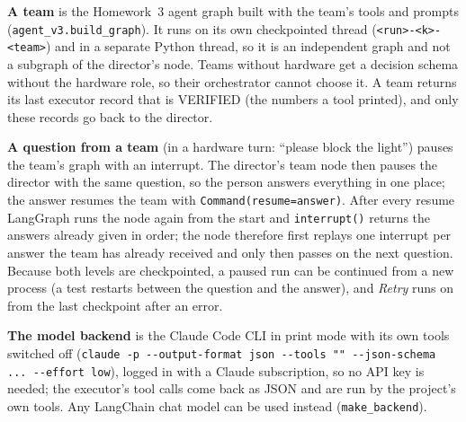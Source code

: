 \documentclass[11pt,a4paper]{article}
\begin{document}
\textbf{A team} is the Homework~3 agent graph built with the team's tools and prompts (\texttt{agent\_v3.build\_graph}).
It runs on its own checkpointed thread (\texttt{<run>-<k>-<team>}) and in a separate Python thread, so it is an
independent graph and not a subgraph of the director's node. Teams without hardware get a decision schema without the
hardware role, so their orchestrator cannot choose it. A team returns its last executor record that is VERIFIED (the
numbers a tool printed), and only these records go back to the director.

\textbf{A question from a team} (in a hardware turn: ``please block the light'') pauses the team's graph with an
interrupt. The director's team node then pauses the director with the same question, so the person answers everything
in one place; the answer resumes the team with \texttt{Command(resume=answer)}. After every resume LangGraph runs the
node again from the start and \texttt{interrupt()} returns the answers already given in order; the node therefore first
replays one interrupt per answer the team has already received and only then passes on the next question. Because both
levels are checkpointed, a paused run can be continued from a new process (a test restarts between the question and
the answer), and \emph{Retry} runs on from the last checkpoint after an error.

\textbf{The model backend} is the Claude Code CLI in print mode with its own tools switched off
(\texttt{claude -p -{}-output-format json -{}-tools "" -{}-json-schema ... -{}-effort low}), logged in with a Claude subscription,
so no API key is needed; the executor's tool calls come back as JSON and are run by the project's own tools. Any
LangChain chat model can be used instead (\texttt{make\_backend}).

\end{document}
